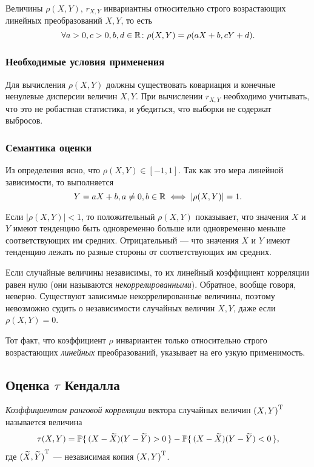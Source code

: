 Величины $\rho(X, Y)$, $r_{X, Y}$ инвариантны относительно строго возрастающих линейных преобразований $X, Y$, то есть
\[
\forall a > 0, c > 0, b, d \in \R \colon \rho(X, Y) = \rho(aX + b, cY + d).
\]

\subsubsection*{Необходимые условия применения}
Для вычисления $\rho(X, Y)$ должны существовать ковариация и конечные ненулевые дисперсии величин $X, Y$. При вычислении $r_{X, Y}$ необходимо учитывать, что это не робастная статистика, и убедиться, что выборки не содержат выбросов.
\subsubsection*{Семантика оценки}
Из определения ясно, что $\rho(X, Y) \in [-1, 1]$. Так как это мера линейной зависимости, то выполняется
\[
Y = aX + b, a \neq 0, b \in \R \iff |\rho(X, Y)| = 1.
\]

Если $|\rho(X, Y)| < 1$, то положительный $\rho(X, Y)$ показывает, что значения $X$ и $Y$ имеют тенденцию быть одновременно больше или одновременно меньше соответствующих им средних. Отрицательный --- что значения $X$ и $Y$ имеют тенденцию лежать по разные стороны от соответствующих им средних.

Если случайные величины независимы, то их линейный коэффициент корреляции равен нулю (они называются \emph{некоррелированными}). Обратное, вообще говоря, неверно. Существуют зависимые некоррелированные величины, поэтому невозможно судить о независимости случайных величин $X, Y$, даже если $\rho(X, Y) = 0$.

Тот факт, что коэффициент $\rho$ инвариантен только относительно строго возрастающих \emph{линейных} преобразований, указывает на его узкую применимость.

\subsection*{Оценка $\tau$ Кендалла}

\begin{define}
\emph{Коэффициентом ранговой корреляции} вектора случайных величин $\trans{(X, Y)}$ называется величина
\begin{equation}\label{eq:tau}
	\tau(X, Y) = \P\{\, (X - \widetilde{X})(Y - \widetilde{Y}) > 0 \,\} - \P\{\, (X - \widetilde{X})(Y - \widetilde{Y}) < 0 \,\},
\end{equation}
где $\trans{(\widetilde{X}, \widetilde{Y})}$ --- независимая копия $\trans{(X, Y)}$.
\end{define}

